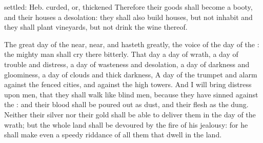 {{settled: Heb. curded, or, thickened}
Therefore their
goods shall become a
booty, and their
houses a
desolation: they shall also
build
houses, but not
inhabit
{} and they shall
plant
vineyards, but not
drink the
wine thereof.
\par }{\PP {}The
great
day of the
{}
{}
near,
{}
near, and
hasteth
greatly,
{} the
voice of the
day of the
{}: the mighty
man shall
cry there
bitterly.
That
day
{} a
day of
wrath, a
day of
trouble and
distress, a
day of
wasteness and
desolation, a
day of
darkness and
gloominess, a
day of
clouds and thick
darkness,
A
day of the
trumpet and
alarm against the
fenced
cities, and against the
high
towers.
And I will bring
distress upon
men, that they shall
walk like blind
men, because they have
sinned against the
{}: and their
blood shall be poured
out as
dust, and their
flesh as the
dung.
Neither their
silver nor their
gold shall be
able to
deliver them in the
day of the
{}
wrath; but the whole
land shall be
devoured by the
fire of his
jealousy: for he shall
make even a
speedy
riddance of all them that
dwell in the
land.

}
